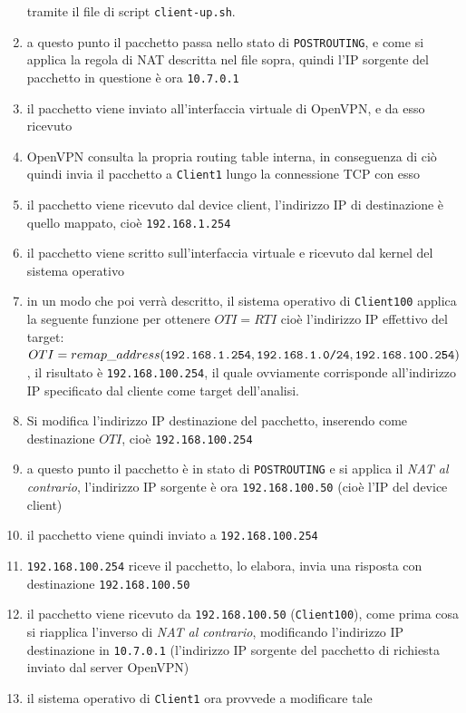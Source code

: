 \begin{enumerate}
  tramite il file di script \texttt{client-up.sh}.
  \item a questo punto il pacchetto passa nello stato di \texttt{POSTROUTING}, e come
  si applica la regola di NAT descritta nel file sopra, quindi l'IP sorgente del
  pacchetto in questione è ora \texttt{10.7.0.1}
  \item il pacchetto viene inviato all'interfaccia
  virtuale di OpenVPN, e da esso ricevuto
  \item OpenVPN consulta la propria routing table interna, in conseguenza di ciò quindi
  invia il pacchetto a \texttt{Client1} lungo la connessione TCP con esso
  \item il pacchetto viene ricevuto dal device client, l'indirizzo IP di destinazione è
  quello mappato, cioè \texttt{192.168.1.254}
  \item il pacchetto viene scritto sull'interfaccia virtuale e ricevuto dal kernel
  del sistema operativo
  \item in un modo che poi verrà descritto, il sistema operativo di \texttt{Client100}
  applica la seguente funzione
  per ottenere $OTI=RTI$ cioè l'indirizzo IP effettivo del target: $OTI=remap\_address(
  \texttt{192.168.1.254}, \texttt{192.168.1.0/24},\\ \texttt{192.168.100.254})$, il
  risultato è \texttt{192.168.100.254}, il quale ovviamente corrisponde all'indirizzo IP
  specificato dal cliente come target dell'analisi.
  \item Si modifica l'indirizzo IP destinazione del pacchetto, inserendo come destinazione
  $OTI$, cioè \texttt{192.168.100.254}
  \item a questo punto il pacchetto è in stato di \texttt{POSTROUTING} e si applica il
  \textit{NAT al contrario}, l'indirizzo IP sorgente è ora \texttt{192.168.100.50}
  (cioè l'IP del device client)
  \item il pacchetto viene quindi inviato a \texttt{192.168.100.254}
  \item \texttt{192.168.100.254} riceve il pacchetto, lo elabora, invia una risposta
  con destinazione \texttt{192.168.100.50}
  \item il pacchetto viene ricevuto da \texttt{192.168.100.50} (\texttt{Client100}),
  come prima cosa
  si riapplica l'inverso di \textit{NAT al contrario}, modificando l'indirizzo IP
  destinazione in \texttt{10.7.0.1} (l'indirizzo IP sorgente del pacchetto di richiesta
  inviato dal server OpenVPN)
  \item il sistema operativo di \texttt{Client1} ora provvede a modificare tale

\end{enumerate}
